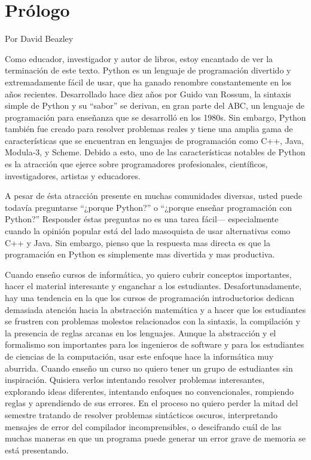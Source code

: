 
\chapter{Prólogo}

Por David Beazley

Como educador, investigador y autor de libros, estoy encantado de ver
la terminación de este texto.  Python es un lenguaje de programación divertido y 
extremadamente fácil de usar, que ha ganado renombre constantemente en los años 
recientes.  Desarrollado hace diez años por Guido van Rossum, la sintaxis simple 
de Python y su ``sabor'' se derivan, en
gran parte del ABC, un lenguaje de programación para  enseñanza que se 
desarrolló en los 1980s.  Sin embargo, Python también fue creado para resolver problemas 
reales y tiene una amplia gama de características que se encuentran en lenguajes de
programación como C++, Java, Modula-3, y Scheme.  Debido a esto, uno de
las características notables de Python es  la  atracción que ejerce 
sobre programadores profesionales, científicos, investigadores, 
artistas y educadores.

A pesar de ésta atracción presente en  muchas  comunidades diversas, usted puede todavía preguntarse ``¿porque Python?'' o ``¿porque enseñar programación con Python?'' Responder 
éstas preguntas no es una tarea fácil---
especialmente cuando la opinión popular está del lado masoquista
de usar alternativas como C++ y Java.  Sin embargo, pienso que la respuesta mas directa es
que la programación en Python es simplemente mas divertida y mas productiva.

Cuando enseño cursos de informática, yo quiero cubrir conceptos
importantes, hacer el material interesante y enganchar a los estudiantes.
Desafortunadamente, hay una tendencia en la  que los cursos de programación
introductorios dedican demasiada atención hacia la abstracción
matemática y a hacer que los estudiantes se frustren con problemas
molestos relacionados con la sintaxis, la compilación  y la presencia
de reglas arcanas en los lenguajes. Aunque la abstracción y el formalismo
son importantes para los ingenieros de software y para los estudiantes de
ciencias de la computación, usar este enfoque hace la informática muy aburrida.
Cuando enseño un curso no quiero tener un grupo de estudiantes sin inspiración.
Quisiera verlos intentando resolver problemas interesantes, explorando ideas diferentes, 
intentando enfoques no convencionales, rompiendo reglas y aprendiendo de sus errores. 
En el proceso no quiero perder la mitad del semestre tratando de resolver
problemas sintácticos oscuros, interpretando mensajes de error del compilador incomprensibles, 
o descifrando cuál de las muchas maneras en que un programa puede generar un 
error grave de memoria se está presentando.


